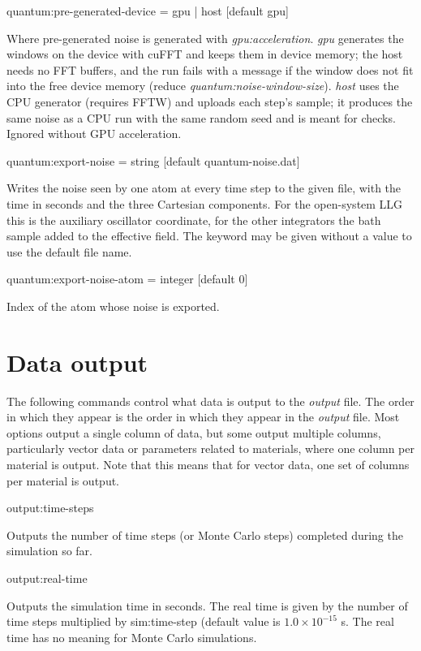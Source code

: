 {\zicf quantum:pre-generated-device = gpu | host [default gpu]}
Where pre-generated noise is generated with \textit{gpu:acceleration}. \textit{gpu} generates the windows on the device with cuFFT and keeps them in device memory; the host needs no FFT buffers, and the run fails with a message if the window does not fit into the free device memory (reduce \textit{quantum:noise-window-size}). \textit{host} uses the CPU generator (requires FFTW) and uploads each step's sample; it produces the same noise as a CPU run with the same random seed and is meant for checks. Ignored without GPU acceleration.

{\zicf quantum:export-noise = string [default quantum-noise.dat]}
Writes the noise seen by one atom at every time step to the given file, with the time in seconds and the three Cartesian components. For the open-system LLG this is the auxiliary oscillator coordinate, for the other integrators the bath sample added to the effective field. The keyword may be given without a value to use the default file name.

{\zicf quantum:export-noise-atom = integer [default 0]}
Index of the atom whose noise is exported.

\section*{Data output}
The following commands control what data is output to the \textit{output} file. The order in which they appear is the order in which they appear in the \textit{output} file. Most options output a single column of data, but some output multiple columns, particularly vector data or parameters related to materials, where one column per material is output. Note that this means that for vector data, one set of columns per material is output.

{\zicf output:time-steps} Outputs the number of time steps (or Monte Carlo steps) completed during the simulation so far.

{\zicf output:real-time} Outputs the simulation time in seconds. The real time is given by the number of time steps multiplied by sim:time-step (default value is $1.0 \times 10^{-15}$ s. The real time has no meaning for Monte Carlo simulations.

